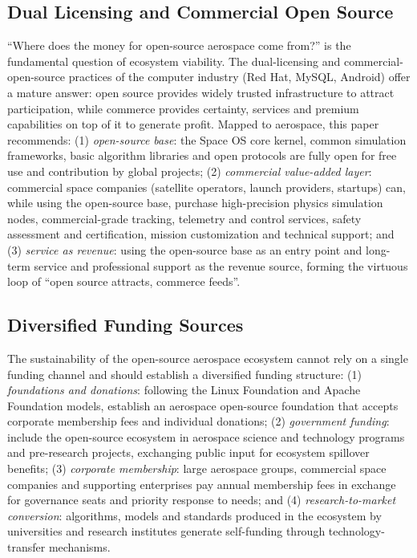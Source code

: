 \documentclass[11pt]{article}
\begin{document}
\subsection{Dual Licensing and Commercial Open Source}
``Where does the money for open-source aerospace come from?'' is the fundamental question of ecosystem viability. The dual-licensing and commercial-open-source practices of the computer industry (Red Hat, MySQL, Android) offer a mature answer: open source provides widely trusted infrastructure to attract participation, while commerce provides certainty, services and premium capabilities on top of it to generate profit. Mapped to aerospace, this paper recommends: (1) \emph{open-source base}: the Space OS core kernel, common simulation frameworks, basic algorithm libraries and open protocols are fully open for free use and contribution by global projects; (2) \emph{commercial value-added layer}: commercial space companies (satellite operators, launch providers, startups) can, while using the open-source base, purchase high-precision physics simulation nodes, commercial-grade tracking, telemetry and control services, safety assessment and certification, mission customization and technical support; and (3) \emph{service as revenue}: using the open-source base as an entry point and long-term service and professional support as the revenue source, forming the virtuous loop of ``open source attracts, commerce feeds''.

\subsection{Diversified Funding Sources}
The sustainability of the open-source aerospace ecosystem cannot rely on a single funding channel and should establish a diversified funding structure: (1) \emph{foundations and donations}: following the Linux Foundation and Apache Foundation models, establish an aerospace open-source foundation that accepts corporate membership fees and individual donations; (2) \emph{government funding}: include the open-source ecosystem in aerospace science and technology programs and pre-research projects, exchanging public input for ecosystem spillover benefits; (3) \emph{corporate membership}: large aerospace groups, commercial space companies and supporting enterprises pay annual membership fees in exchange for governance seats and priority response to needs; and (4) \emph{research-to-market conversion}: algorithms, models and standards produced in the ecosystem by universities and research institutes generate self-funding through technology-transfer mechanisms.
\end{document}

